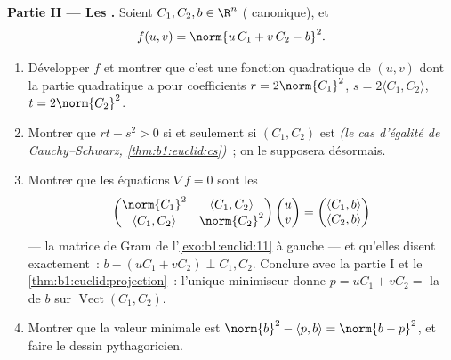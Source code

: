 \begin{problem}
\medskip
\noindent\textbf{Partie II --- Les .} Soient
$C_1, C_2, b \in \R^n$ ( canonique), et
\[
f(u, v) = \norm{u\,C_1 + v\,C_2 - b}^2 .
\]
\begin{enumerate}[resume]
  \item Développer $f$ et montrer que c'est une fonction
        quadratique de $(u, v)$ dont la partie quadratique a pour
        coefficients $r = 2\norm{C_1}^2$,
        $s = 2\langle C_1, C_2\rangle$, $t = 2\norm{C_2}^2$.
  \item Montrer que $rt - s^2 > 0$ si et seulement si $(C_1,
        C_2)$ est  \emph{(le cas d'égalité de
        Cauchy--Schwarz, \cref{thm:b1:euclid:cs})}~; on le
        supposera désormais.
  \item Montrer que les équations  $\nabla f = 0$ sont
        les \emph{}
        \[
        \begin{pmatrix}
        \norm{C_1}^2 & \langle C_1, C_2\rangle\\
        \langle C_1, C_2\rangle & \norm{C_2}^2
        \end{pmatrix}
        \begin{pmatrix} u\\ v\end{pmatrix}
        =
        \begin{pmatrix} \langle C_1, b\rangle\\ \langle C_2,
        b\rangle\end{pmatrix}
        \]
        --- la matrice de Gram de l'\cref{exo:b1:euclid:11} à
        gauche --- et qu'elles disent exactement~: $b - (uC_1 +
        vC_2) \perp C_1, C_2$. Conclure avec la partie I et
        le \cref{thm:b1:euclid:projection}~: l'unique minimiseur
        donne $p = uC_1 + vC_2 = $ la  de
        $b$ sur $\operatorname{Vect}(C_1, C_2)$.
  \item Montrer que la valeur minimale est $\norm{b}^2 - \langle
        p, b\rangle = \norm{b - p}^2$, et faire le dessin
        pythagoricien.
\end{enumerate}


\end{problem}
